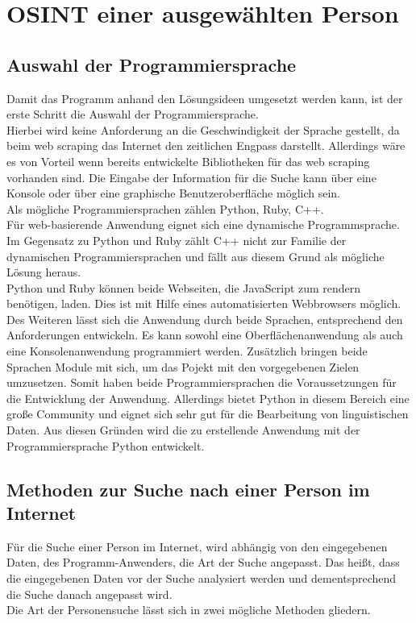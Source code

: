 
\chapter{OSINT einer ausgewählten Person}  %
\label{cha:Informationsbeschaffung einer ausgewählten Person} %

\section{Auswahl der Programmiersprache}
Damit das Programm anhand den Lösungsideen umgesetzt werden kann, ist der erste Schritt die Auswahl der Programmiersprache.\\
Hierbei wird keine Anforderung an die Geschwindigkeit der Sprache gestellt, da beim web scraping das Internet den zeitlichen Engpass darstellt. Allerdings wäre es von Vorteil wenn bereits entwickelte Bibliotheken für das web scraping vorhanden sind. Die Eingabe der Information für die Suche kann über eine Konsole oder über eine graphische Benutzeroberfläche möglich sein.\\
Als mögliche Programmiersprachen zählen Python, Ruby, C++.\\
Für web-basierende Anwendung eignet sich eine dynamische Programmsprache.
Im Gegensatz zu Python und Ruby zählt C++ nicht zur Familie der dynamischen Programmiersprachen und fällt aus diesem Grund als mögliche Lösung heraus. \\
Python und Ruby können beide Webseiten, die JavaScript zum rendern benötigen, laden. Dies ist mit Hilfe eines automatisierten Webbrowsers möglich. Des Weiteren lässt sich die Anwendung durch beide Sprachen, entsprechend den Anforderungen entwickeln. Es kann sowohl eine Oberflächenanwendung als auch eine Konsolenanwendung programmiert werden. Zusätzlich bringen beide Sprachen Module mit sich, um das Pojekt mit den vorgegebenen Zielen umzusetzen. Somit haben beide Programmiersprachen die Voraussetzungen für die Entwicklung der Anwendung. Allerdings bietet Python in diesem Bereich eine große Community und eignet sich sehr gut für die Bearbeitung von linguistischen Daten. \cite{bird2009natural}
Aus diesen Gründen wird die zu erstellende Anwendung mit der Programmiersprache Python entwickelt.
	
\section{Methoden zur Suche nach einer Person im Internet}
\label{sec:Suche nach Information}
Für die Suche einer Person im Internet, wird abhängig von den eingegebenen Daten, des Programm-Anwenders, die Art der Suche angepasst. Das heißt, dass die eingegebenen Daten vor der Suche analysiert werden und dementsprechend die Suche danach angepasst wird. \\
Die Art der Personensuche lässt sich in zwei mögliche Methoden gliedern.

